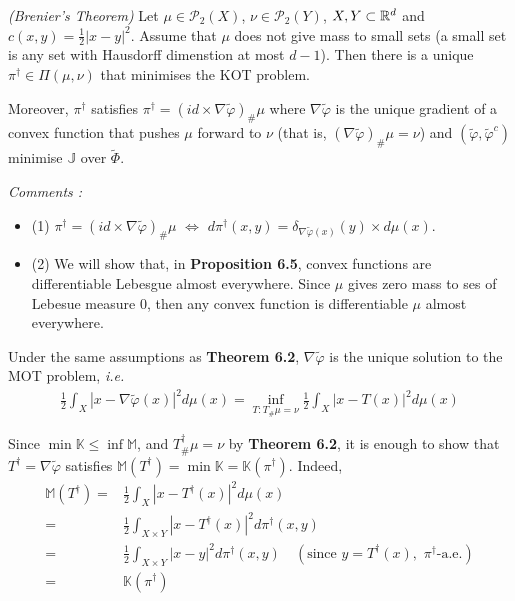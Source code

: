 \documentclass[12pt,a4paper]{article}
\newenvironment{proof}
{\begin{changemargin}{1cm}{0.5cm} 
	}%
	{\end{changemargin}
}
\renewenvironment{i}
{\begin{itemize} 
	}%
	{\end{itemize}
}
\newenvironment{p}
{\begin{proof} 
	}%
	{\end{proof}
}
\begin{document}
 \emph{(Brenier's Theorem)} Let $\mu \in \mathscr{P}_2(X)$, $\nu \in \mathscr{P}_2(Y)$, $X, Y\subset \mathbb{R}^d$ and $c(x,y) = \frac{1}{2} |x-y|^2$. Assume that $\mu$ does not give mass to small sets (a small set is any set with Hausdorff dimenstion at most $d-1$). Then there is a unique $\pi^{\dagger} \in \Pi(\mu, \nu)$ that minimises the KOT problem.

\quad Moreover, $\pi^{\dagger}$ satisfies $\pi^{\dagger} = (id \times \nabla \tilde{\varphi})_{\#} \mu$ where $\nabla \tilde{\varphi}$ is the unique gradient of a convex function that pushes $\mu$ forward to $\nu$ (that is, $(\nabla \tilde{\varphi})_{\#} \mu = \nu$) and $(\tilde{\varphi},\tilde{\varphi}^c)$ minimise $\mathbb{J}$ over $\tilde{\Phi}$.
\s

\emph{Comments :}
\begin{i}
\item[(1)] $\pi^{\dagger} = (id \times \nabla \tilde{\varphi})_{\#} \mu$ $\Leftrightarrow$ $d\pi^{\dagger}(x,y) = \delta_{\nabla \tilde{\varphi}(x)}(y) \times d\mu(x)$.
\item[(2)] We will show that, in \textbf{Proposition 6.5}, convex functions are differentiable Lebesgue almost everywhere. Since $\mu$ gives zero mass to ses of Lebesue measure 0, then any convex function is differentiable $\mu$ almost everywhere.
\end{i}
\s

 Under the same assumptions as \textbf{Theorem 6.2}, $\nabla \tilde{\varphi}$ is the unique solution to the MOT problem, \textit{i.e.}
\begin{align*}
\frac{1}{2} \int_X |x- \nabla \tilde{\varphi}(x)|^2 d\mu(x) = \inf_{T: T_{\#}\mu = \nu} \frac{1}{2} \int_X |x- T(x)|^2 d\mu(x)
\end{align*}
\begin{p}
\pf Since $\min \mathbb{K} \leq \inf \mathbb{M}$, and $T^{\dagger}_{\#} \mu = \nu$ by \textbf{Theorem 6.2}, it is enough to show that $T^{\dagger} = \nabla \tilde{\varphi}$ satisfies $\mathbb{M}(T^{\dagger}) = \min \mathbb{K} = \mathbb{K}(\pi^{\dagger})$. Indeed,
\begin{align*}
\mathbb{M}(T^{\dagger}) =& \frac{1}{2} \int_X |x-T^{\dagger}(x)|^2 d\mu(x) \\
=& \frac{1}{2} \int_{X\times Y} |x- T^{\dagger}(x)|^2 d\pi^{\dagger}(x,y) \\
=& \frac{1}{2} \int_{X\times Y} |x-y|^2 d\pi^{\dagger} (x,y) \quad (\text{since } y =T^{\dagger}(x),\,\, \pi^{\dagger}\text{-a.e.}) \\
=& \mathbb{K}(\pi^{\dagger})
\end{align*}
\eop
\end{p}
\end{document}
